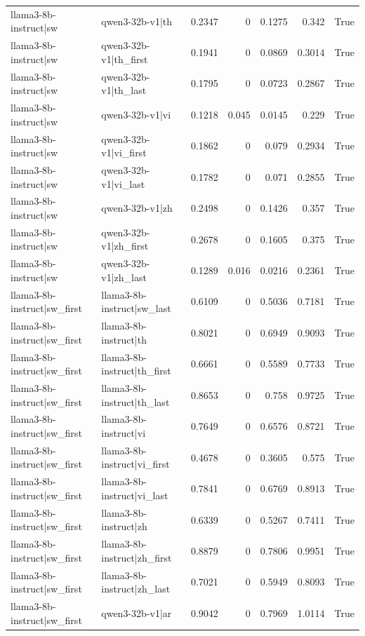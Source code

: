 \begin{table}
\begin{tabular}{l l r r r r l}
llama3-8b-instruct|sw & qwen3-32b-v1|th & 0.2347 & 0 & 0.1275 & 0.342 & True \\
llama3-8b-instruct|sw & qwen3-32b-v1|th_first & 0.1941 & 0 & 0.0869 & 0.3014 & True \\
llama3-8b-instruct|sw & qwen3-32b-v1|th_last & 0.1795 & 0 & 0.0723 & 0.2867 & True \\
llama3-8b-instruct|sw & qwen3-32b-v1|vi & 0.1218 & 0.045 & 0.0145 & 0.229 & True \\
llama3-8b-instruct|sw & qwen3-32b-v1|vi_first & 0.1862 & 0 & 0.079 & 0.2934 & True \\
llama3-8b-instruct|sw & qwen3-32b-v1|vi_last & 0.1782 & 0 & 0.071 & 0.2855 & True \\
llama3-8b-instruct|sw & qwen3-32b-v1|zh & 0.2498 & 0 & 0.1426 & 0.357 & True \\
llama3-8b-instruct|sw & qwen3-32b-v1|zh_first & 0.2678 & 0 & 0.1605 & 0.375 & True \\
llama3-8b-instruct|sw & qwen3-32b-v1|zh_last & 0.1289 & 0.016 & 0.0216 & 0.2361 & True \\
llama3-8b-instruct|sw_first & llama3-8b-instruct|sw_last & 0.6109 & 0 & 0.5036 & 0.7181 & True \\
llama3-8b-instruct|sw_first & llama3-8b-instruct|th & 0.8021 & 0 & 0.6949 & 0.9093 & True \\
llama3-8b-instruct|sw_first & llama3-8b-instruct|th_first & 0.6661 & 0 & 0.5589 & 0.7733 & True \\
llama3-8b-instruct|sw_first & llama3-8b-instruct|th_last & 0.8653 & 0 & 0.758 & 0.9725 & True \\
llama3-8b-instruct|sw_first & llama3-8b-instruct|vi & 0.7649 & 0 & 0.6576 & 0.8721 & True \\
llama3-8b-instruct|sw_first & llama3-8b-instruct|vi_first & 0.4678 & 0 & 0.3605 & 0.575 & True \\
llama3-8b-instruct|sw_first & llama3-8b-instruct|vi_last & 0.7841 & 0 & 0.6769 & 0.8913 & True \\
llama3-8b-instruct|sw_first & llama3-8b-instruct|zh & 0.6339 & 0 & 0.5267 & 0.7411 & True \\
llama3-8b-instruct|sw_first & llama3-8b-instruct|zh_first & 0.8879 & 0 & 0.7806 & 0.9951 & True \\
llama3-8b-instruct|sw_first & llama3-8b-instruct|zh_last & 0.7021 & 0 & 0.5949 & 0.8093 & True \\
llama3-8b-instruct|sw_first & qwen3-32b-v1|ar & 0.9042 & 0 & 0.7969 & 1.0114 & True \\

\end{tabular}
\end{table}
